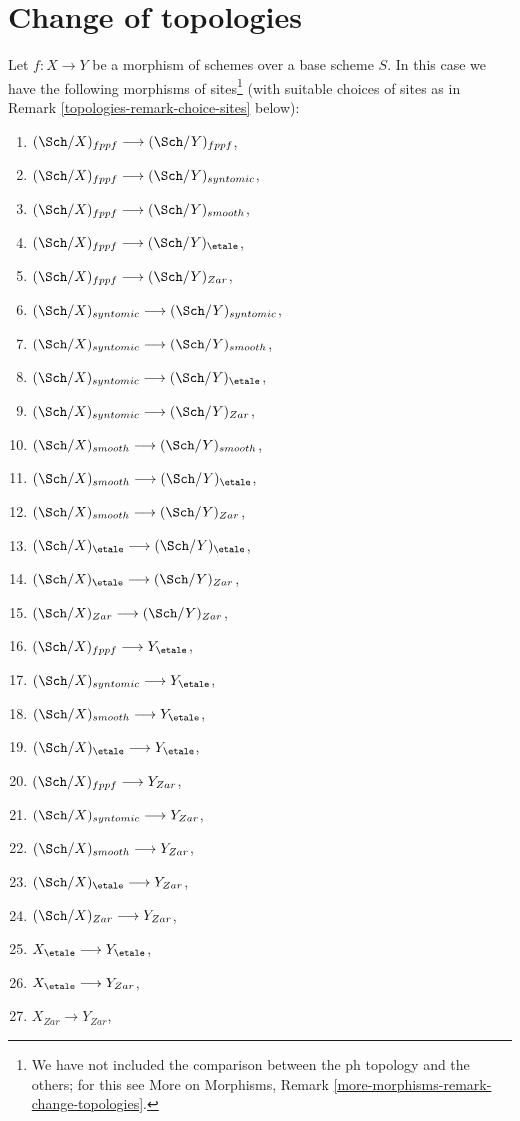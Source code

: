 \section{Change of topologies}
\label{topologies-section-change-topologies}
Let $f : X \to Y$ be a morphism of schemes over a base scheme $S$.
In this case we have the following morphisms of sites\footnote{We have
not included the comparison between the ph topology and the others;
for this see
More on Morphisms, Remark \ref{more-morphisms-remark-change-topologies}.}
(with suitable choices of sites as in Remark \ref{topologies-remark-choice-sites}
below):
\begin{enumerate}
\item $(\Sch/X)_{fppf} \longrightarrow (\Sch/Y)_{fppf}$,
\item $(\Sch/X)_{fppf} \longrightarrow (\Sch/Y)_{syntomic}$,
\item $(\Sch/X)_{fppf} \longrightarrow (\Sch/Y)_{smooth}$,
\item $(\Sch/X)_{fppf} \longrightarrow
(\Sch/Y)_\etale$,
\item $(\Sch/X)_{fppf} \longrightarrow (\Sch/Y)_{Zar}$,
\item $(\Sch/X)_{syntomic} \longrightarrow (\Sch/Y)_{syntomic}$,
\item $(\Sch/X)_{syntomic} \longrightarrow (\Sch/Y)_{smooth}$,
\item $(\Sch/X)_{syntomic} \longrightarrow
(\Sch/Y)_\etale$,
\item $(\Sch/X)_{syntomic} \longrightarrow (\Sch/Y)_{Zar}$,
\item $(\Sch/X)_{smooth} \longrightarrow (\Sch/Y)_{smooth}$,
\item $(\Sch/X)_{smooth} \longrightarrow
(\Sch/Y)_\etale$,
\item $(\Sch/X)_{smooth} \longrightarrow (\Sch/Y)_{Zar}$,
\item $(\Sch/X)_\etale \longrightarrow
(\Sch/Y)_\etale$,
\item $(\Sch/X)_\etale \longrightarrow (\Sch/Y)_{Zar}$,
\item $(\Sch/X)_{Zar} \longrightarrow (\Sch/Y)_{Zar}$,
\item $(\Sch/X)_{fppf} \longrightarrow Y_\etale$,
\item $(\Sch/X)_{syntomic} \longrightarrow Y_\etale$,
\item $(\Sch/X)_{smooth} \longrightarrow Y_\etale$,
\item $(\Sch/X)_\etale \longrightarrow Y_\etale$,
\item $(\Sch/X)_{fppf} \longrightarrow Y_{Zar}$,
\item $(\Sch/X)_{syntomic} \longrightarrow Y_{Zar}$,
\item $(\Sch/X)_{smooth} \longrightarrow Y_{Zar}$,
\item $(\Sch/X)_\etale \longrightarrow Y_{Zar}$,
\item $(\Sch/X)_{Zar} \longrightarrow Y_{Zar}$,
\item $X_\etale \longrightarrow Y_\etale$,
\item $X_\etale \longrightarrow Y_{Zar}$,
\item $X_{Zar} \longrightarrow Y_{Zar}$,
\end{enumerate}
